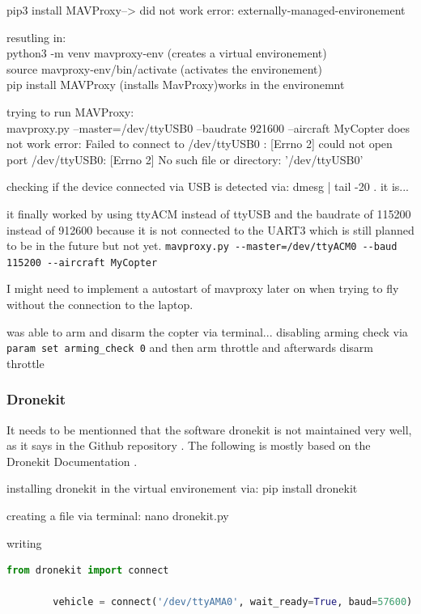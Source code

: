 \documentclass{article}
\begin{document}
	pip3 install MAVProxy--> did not work error: externally-managed-environement
	
	
	resutling in:
	\\python3 -m venv mavproxy-env (creates a virtual environement)
	\\source mavproxy-env/bin/activate (activates the environement)
	\\pip install MAVProxy (installs MavProxy)works in the environemnt
	
	trying to run MAVProxy:
	\\ mavproxy.py --master=/dev/ttyUSB0 --baudrate 921600 --aircraft MyCopter does not work error: Failed to connect to /dev/ttyUSB0 : [Errno 2] could not open port /dev/ttyUSB0: [Errno 2] No such file or directory: '/dev/ttyUSB0'
	
	checking if the device connected via USB is detected via: dmesg | tail -20 . it is...
	

	
	it finally worked by using ttyACM instead of ttyUSB and the baudrate of 115200 instead of 912600 because it is not connected to the UART3 which is still planned to be in the future but not yet. 
	\lstinline|mavproxy.py --master=/dev/ttyACM0 --baud 115200 --aircraft MyCopter|
	
	I might need to implement a autostart of mavproxy later on when trying to fly without the connection to the laptop.
	
	was able to arm and disarm the copter via terminal... disabling arming check via \lstinline|param set arming_check 0| and then arm throttle and afterwards disarm throttle
	
	\subsubsection{Dronekit}
	It needs to be mentionned that the software dronekit is not maintained very well, as it says in the Github repository \cite{dronekitgithub}.
	The following is mostly based on the Dronekit Documentation \cite{dronekitdocs}.
	
	installing dronekit in the virtual environement via: pip install dronekit 
	
	creating a file via terminal: nano dronekit.py
	
	writing 
	\begin{lstlisting}[language=python, caption=Python DroneKit Example, label={lst:dronekit-example}]
		from dronekit import connect
		
		vehicle = connect('/dev/ttyAMA0', wait_ready=True, baud=57600)
	\end{lstlisting}
	
\end{document}
